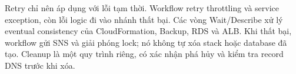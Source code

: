Retry chỉ nên áp dụng với lỗi tạm thời. Workflow retry throttling và service exception, còn lỗi logic đi vào nhánh thất bại. Các vòng Wait/Describe xử lý eventual consistency của CloudFormation, Backup, RDS và ALB. Khi thất bại, workflow gửi SNS và giải phóng lock; nó không tự xóa stack hoặc database đã tạo. Cleanup là một quy trình riêng, có xác nhận phá hủy và kiểm tra record DNS trước khi xóa.
